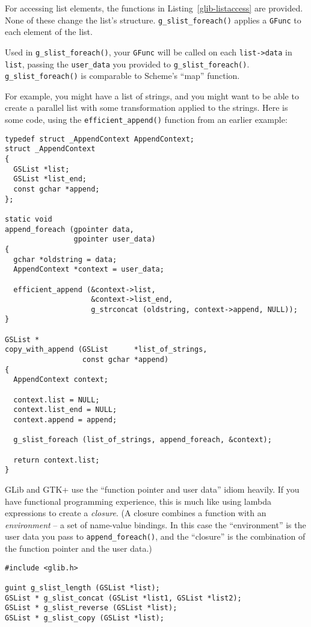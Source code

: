 For accessing list elements, the functions in Listing~\ref{glib-listaccess} are provided. None of these change the list's structure. \lstinline{g_slist_foreach()} applies a \lstinline{GFunc} to each element of the list.

Used in \lstinline{g_slist_foreach()}, your \lstinline{GFunc} will be called on each \lstinline{list->data} in \lstinline{list}, passing the \lstinline{user_data} you provided to \lstinline{g_slist_foreach()}. \lstinline{g_slist_foreach()} is comparable to Scheme's ``map'' function.

For example, you might have a list of strings, and you might want to be able to create a parallel list with some transformation applied to the strings. Here is some code, using the \lstinline{efficient_append()} function from an earlier example:

\begin{lstlisting}
typedef struct _AppendContext AppendContext;
struct _AppendContext
{
  GSList *list;
  GSList *list_end;
  const gchar *append;
};

static void
append_foreach (gpointer data,
                gpointer user_data)
{
  gchar *oldstring = data;
  AppendContext *context = user_data;

  efficient_append (&context->list,
                    &context->list_end,
                    g_strconcat (oldstring, context->append, NULL));
}

GSList *
copy_with_append (GSList      *list_of_strings,
                  const gchar *append)
{
  AppendContext context;

  context.list = NULL;
  context.list_end = NULL;
  context.append = append;

  g_slist_foreach (list_of_strings, append_foreach, &context);

  return context.list;
}
\end{lstlisting}

GLib and GTK+ use the ``function pointer and user data'' idiom heavily. If you have functional programming experience, this  is much like using lambda expressions to create a \emph{closure}. (A closure combines a function with an \emph{environment} -- a set of name-value bindings. In this case the ``environment'' is the user data you pass to \lstinline{append_foreach()}, and the ``closure'' is the combination of the function pointer and the user data.)

\begin{lstlisting}[float, caption={Manipulating a linked list}, label=glib-listmanip]
#include <glib.h>

guint g_slist_length (GSList *list);
GSList * g_slist_concat (GSList *list1, GSList *list2);
GSList * g_slist_reverse (GSList *list);
GSList * g_slist_copy (GSList *list);
\end{lstlisting}

